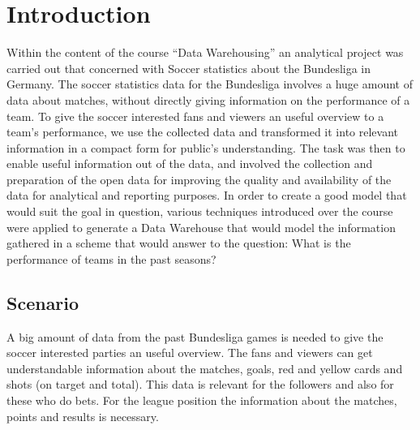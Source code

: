 \documentclass[11pt, journal]{IEEEtran}
\begin{document}


\section{Introduction}
\label{sec:intro}
Within the content of the course “Data Warehousing” an analytical project was carried out that concerned with Soccer statistics about the Bundesliga in Germany. The soccer statistics data for the Bundesliga involves a huge amount of data about matches, without directly giving information on the performance of a team. To give the soccer interested fans and viewers an useful overview to a team's performance, we use the collected data and transformed it into relevant information in a compact form for public's understanding. The task was then to enable useful information out of the data, and involved the collection and preparation of the open data for improving the quality and availability of the data for analytical and reporting purposes. In order to create a good model that would suit the goal in question, various techniques introduced over the course were applied to generate a Data Warehouse that would model the information gathered in a scheme that would answer to the question: What is the performance of teams in the past seasons?

\subsection{Scenario} \label{subsec:scenario}
A big amount of data from the past Bundesliga games is needed to give the soccer interested parties an useful overview. The fans and viewers can get understandable information about the matches, goals, red and yellow cards and shots (on target and total). This data is relevant for the followers and also for these who do bets. For the league position the information about the matches, points and results is necessary.
\end{document}
